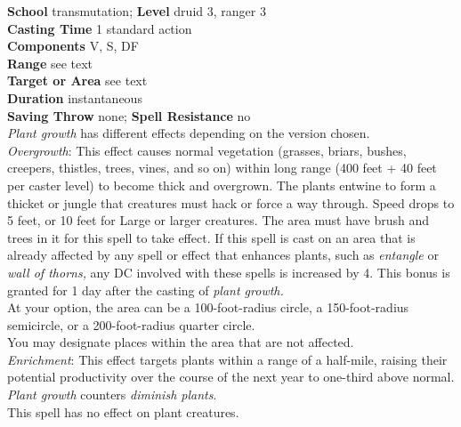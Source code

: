 \textbf{School} transmutation; \textbf{Level} druid 3, ranger 3\\
\textbf{Casting Time} 1 standard action\\
\textbf{Components} V, S, DF\\
\textbf{Range} see text\\
\textbf{Target or Area} see text\\
\textbf{Duration} instantaneous\\
\textbf{Saving Throw} none; \textbf{Spell Resistance} no\\
\textit{Plant growth }has different effects depending on the version chosen.\\
\textit{Overgrowth}: This effect causes normal vegetation (grasses, briars, bushes, creepers, thistles, trees, vines, and so on) within long range (400 feet + 40 feet per caster level) to become thick and overgrown. The plants entwine to form a thicket or jungle that creatures must hack or force a way through. Speed drops to 5 feet, or 10 feet for Large or larger creatures. The area must have brush and trees in it for this spell to take effect. If this spell is cast on an area that is already affected by any spell or effect that enhances plants, such as \textit{entangle} or \textit{wall of thorns, }any DC involved with these spells is increased by 4. This bonus is granted for 1 day after the casting of \textit{plant growth.}\\
At your option, the area can be a 100-foot-radius circle, a 150-foot-radius semicircle, or a 200-foot-radius quarter circle.\\
You may designate places within the area that are not affected.\\
\textit{Enrichment}: This effect targets plants within a range of a half-mile, raising their potential productivity over the course of the next year to one-third above normal.\\
\textit{Plant growth }counters \textit{diminish plants}.\\
This spell has no effect on plant creatures.\\
